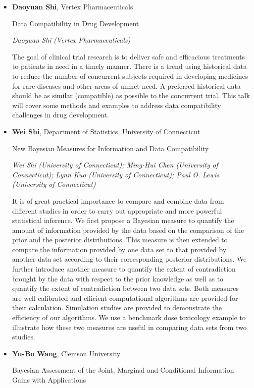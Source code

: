 \begin{itemize}
\item \textbf{Daoyuan Shi}, Vertex Pharmaceuticals

Data Compatibility in Drug Development

\emph{\footnotesize Daoyuan Shi (Vertex Pharmaceuticals)}

The goal of clinical trial research is to deliver safe and efficacious treatments to patients in need in a timely manner. There is a trend using historical data to reduce the number of concurrent subjects required in developing medicines for rare diseases and other areas of unmet need. A preferred historical data should be as similar (compatible) as possible to the concurrent trial. This talk will cover some methods and examples to address data compatibility challenges in drug development.

\item \textbf{Wei Shi}, Department of Statistics, University of Connecticut

New Bayesian Measures for Information and Data Compatibility

\emph{\footnotesize Wei Shi (University of Connecticut); Ming-Hui Chen (University of Connecticut); Lynn Kuo (University of Connecticut); Paul O. Lewis (University of Connecticut)}

It is of great practical importance to compare and combine data from different studies in order to carry out appropriate and more powerful statistical inference. We first propose a Bayesian measure to quantify the amount of information provided by the data based on the comparison of the prior and the posterior distributions. This measure is then extended to compare the information provided by one data set to that provided by another data set according to their corresponding posterior distributions. We further introduce another measure to quantify the extent of contradiction brought by the  data with respect to the prior knowledge as well as to quantify the extent of contradiction between two data sets. Both measures are well calibrated and efficient computational algorithms are provided for their calculation. Simulation studies are provided to demonstrate the efficiency of our algorithms. We use a benchmark dose toxicology example to illustrate how these two measures are useful in comparing data sets from two studies.

\item \textbf{Yu-Bo Wang}, Clemson University

Bayesian Assessment of the Joint, Marginal and Conditional Information Gains with Applications


\end{itemize}
